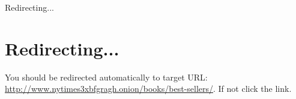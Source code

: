 Redirecting...

\hypertarget{redirecting}{%
\section{Redirecting...}\label{redirecting}}

You should be redirected automatically to target URL:
\url{http://www.nytimes3xbfgragh.onion/books/best-sellers/}. If not
click the link.

